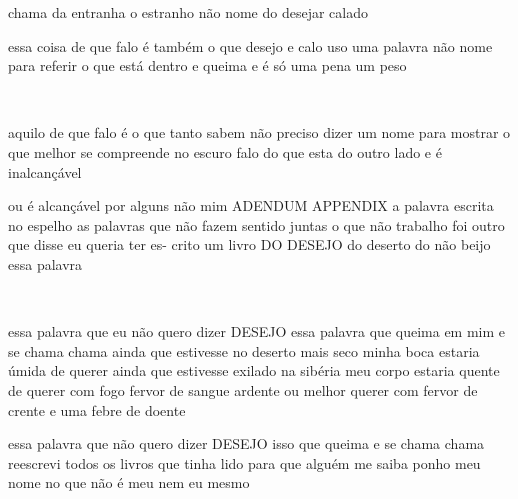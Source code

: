 \begin{poem}
\begin{stanza}
chama da entranha\verseline
o estranho não nome\verseline
do desejar calado
\end{stanza}
{
\begin{minipage}[t]{\textwidth}
\begin{stanza}
essa coisa de que falo\verseline
é também o que desejo\verseline
e calo\verseline
uso uma palavra\verseline
não nome\verseline
para referir o que está dentro\verseline
e queima\verseline
e é só uma pena\verseline
um peso
\end{stanza}
\end{minipage}
}\\
\begin{stanza}
aquilo de que falo\verseline
é o que tanto sabem\verseline
não preciso dizer um nome\verseline
para mostrar o que melhor\verseline
se compreende no escuro\verseline
falo do que esta do outro lado\verseline
e é inalcançável
\end{stanza}
{
\begin{minipage}[t]{\textwidth}
\begin{stanza}
ou é alcançável por alguns não mim\verseline
\qquad ADENDUM\verseline
\qquad APPENDIX\verseline 
a palavra escrita no espelho\verseline
as palavras que não fazem\verseline
sentido juntas \qquad o que não trabalho\verseline
foi outro que disse \qquad eu queria ter es-\verseline
crito um livro \qquad DO DESEJO\verseline
do deserto do não beijo essa palavra
\end{stanza}
\end{minipage}
}\\
\begin{stanza}
essa palavra que eu não quero dizer\verseline
\qquad DESEJO\verseline
essa palavra que queima em mim e se chama\verseline
chama \qquad ainda que estivesse no deserto\verseline
mais seco \qquad minha boca estaria úmida\verseline
de querer \qquad ainda que estivesse exilado\verseline
na sibéria \qquad meu corpo estaria quente\verseline
de querer com fogo \quad fervor de sangue ardente\verseline
ou melhor querer com fervor de crente\verseline
e uma febre de doente
\end{stanza}
\begin{stanza}
essa palavra que não quero dizer\verseline
\qquad DESEJO\verseline
isso que queima e se chama\verseline
chama \qquad reescrevi todos os livros\verseline
que tinha lido\verseline
para que alguém me saiba\verseline
ponho meu nome no que não é meu\verseline
nem eu mesmo\verseline

\end{stanza}
\end{poem}
